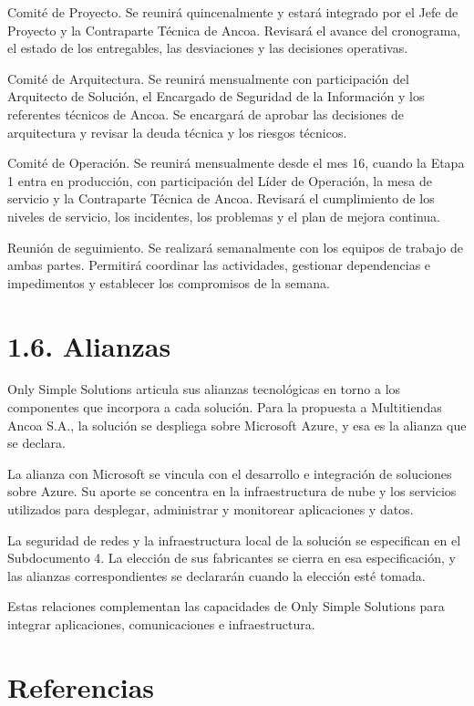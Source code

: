 \documentclass[11pt]{article}
\begin{document}
Comité de Proyecto. Se reunirá quincenalmente y estará integrado por el Jefe de Proyecto y la Contraparte Técnica de Ancoa. Revisará el avance del cronograma, el estado de los entregables, las desviaciones y las decisiones operativas.

Comité de Arquitectura. Se reunirá mensualmente con participación del Arquitecto de Solución, el Encargado de Seguridad de la Información y los referentes técnicos de Ancoa. Se encargará de aprobar las decisiones de arquitectura y revisar la deuda técnica y los riesgos técnicos.

Comité de Operación. Se reunirá mensualmente desde el mes 16, cuando la Etapa 1 entra en producción, con participación del Líder de Operación, la mesa de servicio y la Contraparte Técnica de Ancoa. Revisará el cumplimiento de los niveles de servicio, los incidentes, los problemas y el plan de mejora continua.

Reunión de seguimiento. Se realizará semanalmente con los equipos de trabajo de ambas partes. Permitirá coordinar las actividades, gestionar dependencias e impedimentos y establecer los compromisos de la semana.

\section{1.6. Alianzas}\label{alianzas}

Only Simple Solutions articula sus alianzas tecnológicas en torno a los componentes que incorpora a cada solución. Para la propuesta a Multitiendas Ancoa S.A., la solución se despliega sobre Microsoft Azure, y esa es la alianza que se declara.

La alianza con Microsoft se vincula con el desarrollo e integración de soluciones sobre Azure. Su aporte se concentra en la infraestructura de nube y los servicios utilizados para desplegar, administrar y monitorear aplicaciones y datos.

La seguridad de redes y la infraestructura local de la solución se especifican en el Subdocumento 4. La elección de sus fabricantes se cierra en esa especificación, y las alianzas correspondientes se declararán cuando la elección esté tomada.

Estas relaciones complementan las capacidades de Only Simple Solutions para integrar aplicaciones, comunicaciones e infraestructura.

\section*{Referencias}
\end{document}
